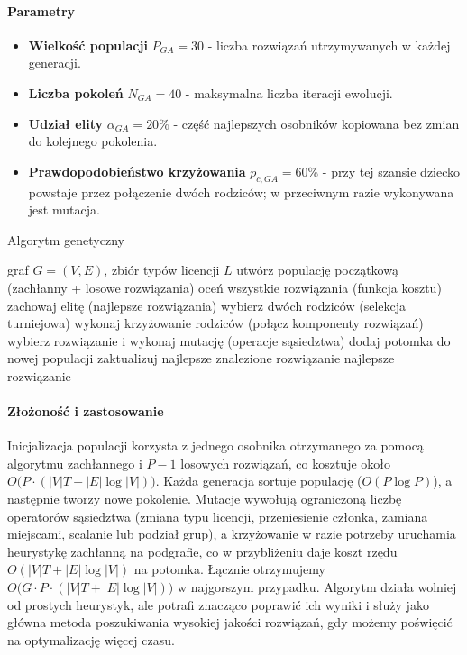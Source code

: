 \paragraph{Parametry}
\begin{itemize}
  \item \textbf{Wielkość populacji} $P_{GA}=30$ - liczba rozwiązań utrzymywanych w każdej generacji.
  \item \textbf{Liczba pokoleń} $N_{GA}=40$ - maksymalna liczba iteracji ewolucji.
  \item \textbf{Udział elity} $\alpha_{GA}=20\%$ - część najlepszych osobników kopiowana bez zmian do kolejnego pokolenia.
  \item \textbf{Prawdopodobieństwo krzyżowania} $p_{c,GA}=60\%$ - przy tej szansie dziecko powstaje przez połączenie dwóch rodziców; w przeciwnym razie wykonywana jest mutacja.
\end{itemize}

\begin{algorithm}[H]
  \caption{Algorytm genetyczny}
  \label{alg:ga}
  \begin{algorithmic}[1]
    \Require graf $G=(V,E)$, zbiór typów licencji $L$
    \State utwórz populację początkową (zachłanny + losowe rozwiązania)
    \State oceń wszystkie rozwiązania (funkcja kosztu)
    \State zachowaj elitę (najlepsze rozwiązania)
    \State wybierz dwóch rodziców (selekcja turniejowa)
    \State wykonaj krzyżowanie rodziców (połącz komponenty rozwiązań)
    \Else
    \State wybierz rozwiązanie i wykonaj mutację (operacje sąsiedztwa)
    \EndIf
    \State dodaj potomka do nowej populacji
    \EndWhile
    \State zaktualizuj najlepsze znalezione rozwiązanie
    \EndFor
    \State \Return najlepsze rozwiązanie
  \end{algorithmic}
\end{algorithm}

\paragraph{Złożoność i zastosowanie}
Inicjalizacja populacji korzysta z jednego osobnika otrzymanego za pomocą algorytmu zachłannego i $P-1$ losowych rozwiązań, co kosztuje około $O\bigl(P \cdot (|V|T + |E|\log |V|)\bigr)$. Każda generacja sortuje populację ($O(P\log P)$), a następnie tworzy nowe pokolenie. Mutacje wywołują ograniczoną liczbę operatorów sąsiedztwa (zmiana typu licencji, przeniesienie członka, zamiana miejscami, scalanie lub podział grup), a krzyżowanie w razie potrzeby uruchamia heurystykę zachłanną na podgrafie, co w przybliżeniu daje koszt rzędu $O(|V|T + |E|\log |V|)$ na potomka. Łącznie otrzymujemy $O\bigl(G \cdot P \cdot (|V|T + |E|\log |V|)\bigr)$ w najgorszym przypadku. Algorytm działa wolniej od prostych heurystyk, ale potrafi znacząco poprawić ich wyniki i służy jako główna metoda poszukiwania wysokiej jakości rozwiązań, gdy możemy poświęcić na optymalizację więcej czasu.



